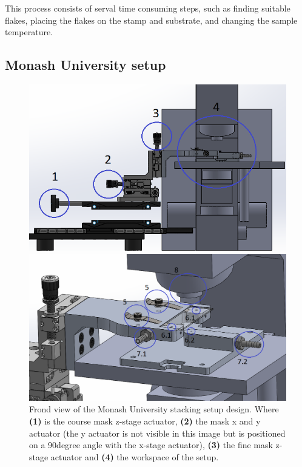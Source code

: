 \documentclass[10pt]{article}
\begin{document}
 This process consists of serval time consuming steps, such as finding suitable flakes, placing the flakes on the stamp and substrate, and changing the sample temperature.


\subsection{Monash University setup}

\begin{figure}[H]
  \centering
  \begin{minipage}[b]{0.45\textwidth}
    \includegraphics[width=\textwidth]{img/design_cycle/monash_frond_view_with_markings.png}
    \caption{Frond view of the Monash University stacking setup design. Where \textbf{(1)} is the course mask z-stage actuator, \textbf{(2)} the mask x and y actuator (the y actuator is not visible in this image but is positioned on a 90degree angle with the x-stage actuator), \textbf{(3)} the fine mask z-stage actuator and \textbf{(4)} the workspace of the setup.}
    \label{fig:monash_frond}
  \end{minipage}
  \hfill
  \begin{minipage}[b]{0.53\textwidth}
    \includegraphics[width=\textwidth]{img/design_cycle/monash_workspace_with_markings.png}

\end{minipage}
\end{figure}
\end{document}
